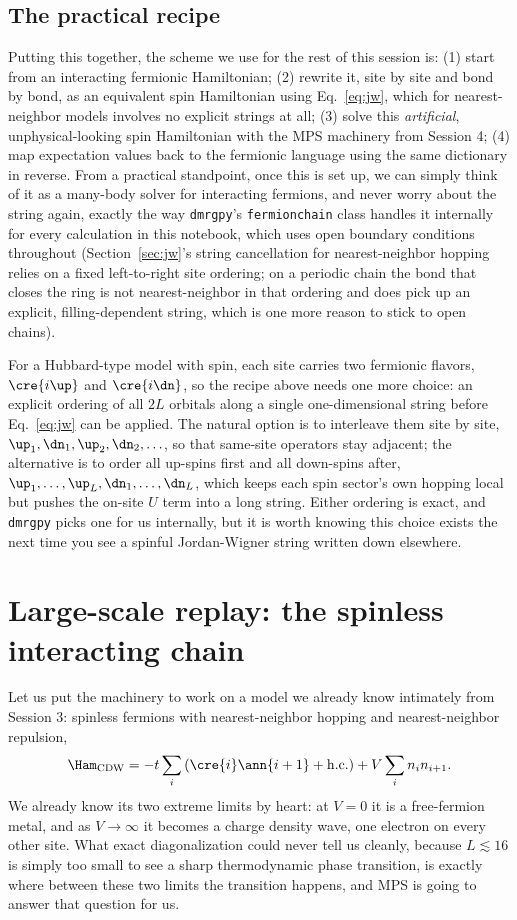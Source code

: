 \documentclass[all_sessions.tex]{subfiles}
\begin{document}
\subsection{The practical recipe}
Putting this together, the scheme we use for the rest of this session is: (1) start from an
interacting fermionic Hamiltonian; (2) rewrite it, site by site and bond by bond, as an equivalent
spin Hamiltonian using Eq.~\eqref{eq:jw}, which for nearest-neighbor models involves no explicit
strings at all; (3) solve this \emph{artificial}, unphysical-looking spin Hamiltonian with the MPS
machinery from Session 4; (4) map expectation values back to the fermionic language using the same
dictionary in reverse. From a practical standpoint, once this is set up, we can simply think of it
as a many-body solver for interacting fermions, and never worry about the string again, exactly the
way \texttt{dmrgpy}'s \texttt{fermionchain} class handles it internally for every calculation in
this notebook, which uses open boundary conditions throughout (Section~\ref{sec:jw}'s string
cancellation for nearest-neighbor hopping relies on a fixed left-to-right site ordering; on a
periodic chain the bond that closes the ring is not nearest-neighbor in that ordering and does pick
up an explicit, filling-dependent string, which is one more reason to stick to open chains).

For a Hubbard-type model with spin, each site carries two fermionic flavors, $\cre{i\up}$ and
$\cre{i\dn}$, so the recipe above needs one more choice: an explicit ordering of all $2L$ orbitals
along a single one-dimensional string before Eq.~\eqref{eq:jw} can be applied. The natural option is
to interleave them site by site, $\up_1,\dn_1,\up_2,\dn_2,\ldots$, so that same-site operators stay
adjacent; the alternative is to order all up-spins first and all down-spins after,
$\up_1,\ldots,\up_L,\dn_1,\ldots,\dn_L$, which keeps each spin sector's own hopping local but pushes
the on-site $U$ term into a long string. Either ordering is exact, and \texttt{dmrgpy} picks one for
us internally, but it is worth knowing this choice exists the next time you see a spinful
Jordan-Wigner string written down elsewhere.

\section{Large-scale replay: the spinless interacting chain}
\label{sec:spinless}
Let us put the machinery to work on a model we already know intimately from Session 3: spinless
fermions with nearest-neighbor hopping and nearest-neighbor repulsion,
\begin{equation}
  \Ham_{\mathrm{CDW}} = -t\sum_i\left(\cre{i}\ann{i+1}+\mathrm{h.c.}\right) + V\sum_i n_in_{i+1}.
  \label{eq:cdw}
\end{equation}
We already know its two extreme limits by heart: at $V=0$ it is a free-fermion metal, and as
$V\to\infty$ it becomes a charge density wave, one electron on every other site. What exact
diagonalization could never tell us cleanly, because $L\lesssim 16$ is simply too small to see a
sharp thermodynamic phase transition, is exactly where between these two limits the transition
happens, and MPS is going to answer that question for us.
\end{document}
